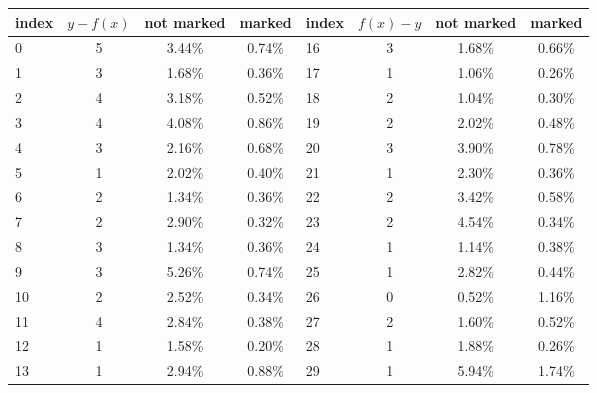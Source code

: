 \documentclass[reqno, 10pt]{amsart}
\numberwithin{equation}{section}                %
\begin{document}
\begin{table}[ht]
   \begin{tabular}{|l|c|c|c||l|c|c|c|}
      \hline
      index & $y - f (x)$ & not marked & marked & index & $f (x) - y$ & not marked & marked \\
      \hline
      0 & 5 & {\color{ForestGreen} 3.44\%} & {\color{Red} 0.74\%} & 16 & 3 & {\color{ForestGreen} 1.68\%} & {\color{Red} 0.66\%} \\
      1 & 3 & {\color{ForestGreen} 1.68\%} & {\color{Red} 0.36\%} & 17 & 1 & {\color{ForestGreen} 1.06\%} & {\color{Red} 0.26\%} \\
      2 & 4 & {\color{ForestGreen} 3.18\%} & {\color{Red} 0.52\%} & 18 & 2 & {\color{ForestGreen} 1.04\%} & {\color{Red} 0.30\%} \\
      3 & 4 & {\color{ForestGreen} 4.08\%} & {\color{Red} 0.86\%} & 19 & 2 & {\color{ForestGreen} 2.02\%} & {\color{Red} 0.48\%} \\
      4 & 3 & {\color{ForestGreen} 2.16\%} & {\color{Red} 0.68\%} & 20 & 3 & {\color{ForestGreen} 3.90\%} & {\color{Red} 0.78\%} \\
      5 & 1 & {\color{ForestGreen} 2.02\%} & {\color{Red} 0.40\%} & 21 & 1 & {\color{ForestGreen} 2.30\%} & {\color{Red} 0.36\%} \\
      6 & 2 & {\color{ForestGreen} 1.34\%} & {\color{Red} 0.36\%} & 22 & 2 & {\color{ForestGreen} 3.42\%} & {\color{Red} 0.58\%} \\
      7 & 2 & {\color{ForestGreen} 2.90\%} & {\color{Red} 0.32\%} & 23 & 2 & {\color{ForestGreen} 4.54\%} & {\color{Red} 0.34\%} \\
      8 & 3 & {\color{ForestGreen} 1.34\%} & {\color{Red} 0.36\%} & 24 & 1 & {\color{ForestGreen} 1.14\%} & {\color{Red} 0.38\%} \\
      9 & 3 & {\color{ForestGreen} 5.26\%} & {\color{Red} 0.74\%} & 25 & 1 & {\color{ForestGreen} 2.82\%} & {\color{Red} 0.44\%} \\
      10 & 2 & {\color{ForestGreen} 2.52\%} & {\color{Red} 0.34\%} & 26 & 0 & {\color{Red} 0.52\%} & {\color{ForestGreen} 1.16\%} \\
      11 & 4 & {\color{ForestGreen} 2.84\%} & {\color{Red} 0.38\%} & 27 & 2 & {\color{ForestGreen} 1.60\%} & {\color{Red} 0.52\%} \\
      12 & 1 & {\color{ForestGreen} 1.58\%} & {\color{Red} 0.20\%} & 28 & 1 & {\color{ForestGreen} 1.88\%} & {\color{Red} 0.26\%} \\
      13 & 1 & {\color{ForestGreen} 2.94\%} & {\color{Red} 0.88\%} & 29 & 1 & {\color{ForestGreen} 5.94\%} & {\color{Red} 1.74\%} \\

\end{tabular}
\end{table}
\end{document}
